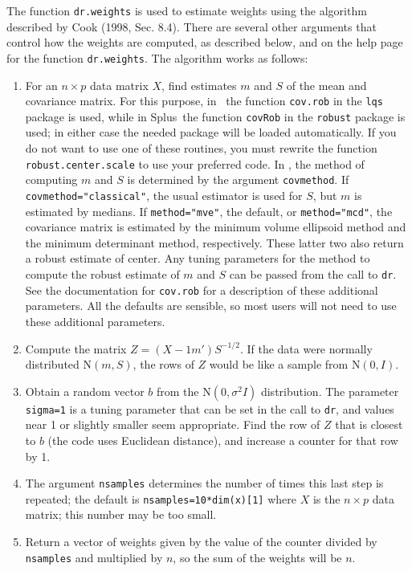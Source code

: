 \documentclass{article}
\newcommand{\Splus}{{\normalfont\textsf{Splus}}{}}
\newcommand{\dcode}[1]{{\small{\tt #1}}}
\newcommand{\ir}{{\tt dr}}
\newcommand{\dr}{{\tt dr}}
\newcommand{\N}{\mbox{N}}
\begin{document}
The function \dcode{dr.weights} is used to estimate weights using the
algorithm described by Cook (1998, Sec. 8.4).  There are several
other arguments that control how the weights are computed, as
described below, and on the help page for the function
\dcode{dr.weights}.  The algorithm works as follows:
\begin{enumerate}
    \item For an $n\times p$ data matrix $X$, find estimates $m$ and $S$
    of the mean and covariance matrix.  For this purpose, in \R\ the function
    \dcode{cov.rob} in the \dcode{lqs} package is used, while in \Splus\ the
    function \dcode{covRob} in the \dcode{robust} package is used; in either
    case the needed package will be loaded automatically.
    If you do not want to use one of these routines, you must rewrite the
    function
    \dcode{robust.center.scale} to use your preferred code.
    In \R, the method of computing $m$ and $S$ is determined
    by the argument \dcode{covmethod}.  If \dcode{covmethod="classical"}, the
    usual estimator is used for $S$, but $m$ is estimated by medians.  If
    \dcode{method="mve"}, the default, or \dcode{method="mcd"}, the
    covariance matrix is estimated by the minimum volume ellipsoid method
    and the minimum determinant method, respectively.  These latter two also
    return a robust estimate of center.  Any tuning parameters for
    the method to compute the robust estimate of $m$ and $S$
    can be passed from the call to \dr.
    See the documentation for
    \dcode{cov.rob} for a description of these additional parameters.  All
    the defaults are sensible, so most users will not need to use these
    additional parameters.
   \item Compute the matrix $Z = (X - 1m')S^{-1/2}$.  If the data were
   normally distributed $\N(m,S)$, the rows of $Z$ would be like a
   sample from $\N(0,I)$.
   \item Obtain a random vector $b$ from the $\N(0,\sigma^2I)$ distribution.
   The parameter \dcode{sigma=1} is a tuning parameter that can be set in
   the call to \ir, and values near 1 or slightly smaller seem
   appropriate.  Find the row of $Z$ that is closest to $b$ (the code uses
   Euclidean distance), and increase a counter for that row by 1.
   \item The argument \dcode{nsamples} determines the number of times this
   last step is repeated; the default is
   \dcode{nsamples=10*dim(x)[1]}
   where $X$ is the $n\times p$ data matrix; this number may be too small.
   \item Return a vector of weights given by the value of the counter
   divided by \dcode{nsamples} and multiplied by $n$, so the sum of the
   weights will be $n$.
   \end{enumerate}
\end{document}
